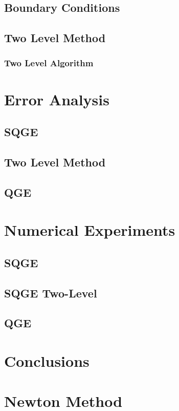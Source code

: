 \documentclass{VTthesis}
\begin{document}
    \section{Boundary Conditions} \label{sse:BCs}
    
    \section{Two Level Method} \label{sec:TwoLevel}
    
      \subsection{Two Level Algorithm} \label{sse:Algorithm}
      

  \chapter{Error Analysis} \label{ch:Errors}
    \section{SQGE} \label{sec:SQGEErrors}
    
    \section{Two Level Method} \label{sse:SQGE2LE}
    
    \section{QGE} \label{sec:QGEError}
    

  \chapter{Numerical Experiments} \label{ch:Tests}
  \section{SQGE} \label{sec:SQGETests}
  
  \section{SQGE Two-Level} \label{sec:SQGE2LTests}
  
  \section{QGE} \label{sec:QGETests}
  

  \chapter{Conclusions} \label{ch:Conclusions}
  

  
  

  \appendix
  \chapter{Newton Method} \label{sec:Newton}
  
\end{document}

